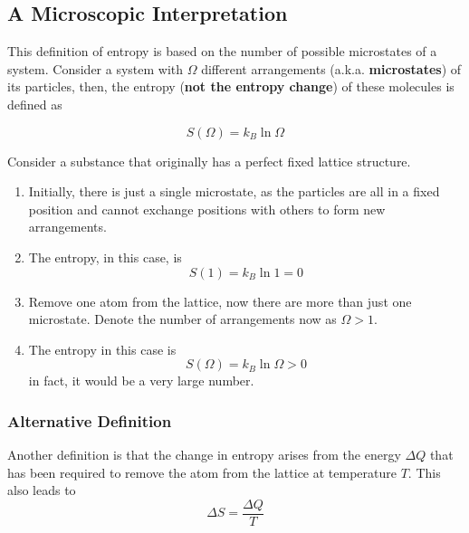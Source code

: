 \documentclass[a4paper,12pt]{article}
\begin{document}
\pagebreak

\subsection{A Microscopic Interpretation}

This definition of entropy is based on the number of possible microstates of a system. Consider a system with $\Omega$ different arrangements (a.k.a. \textbf{microstates}) of its particles, then, the entropy (\textbf{not the entropy change}) of these molecules is defined as

\begin{equation}\label{eq:microentropy}
  S(\Omega) = k_B\ln\Omega
\end{equation}

Consider a substance that originally has a perfect fixed lattice structure.
\begin{enumerate}
  \item Initially, there is just a single microstate, as the particles are all in a fixed position and cannot exchange positions with others to form new arrangements.
  \item The entropy, in this case, is $$S(1) = k_B\ln 1 = 0$$
  \item Remove one atom from the lattice, now there are more than just one microstate. Denote the number of arrangements now as $\Omega > 1$.
  \item The entropy in this case is $$S(\Omega) = k_B\ln\Omega > 0$$
        in fact, it would be a very large number.
\end{enumerate}

\pagebreak

\subsubsection{Alternative Definition}

Another definition is that the change in entropy arises from the energy $\Delta Q$ that has been required to remove the atom from the lattice at temperature $T$. This also leads to
$$
  \Delta S = \dfrac{\Delta Q}{T}
$$
\end{document}
